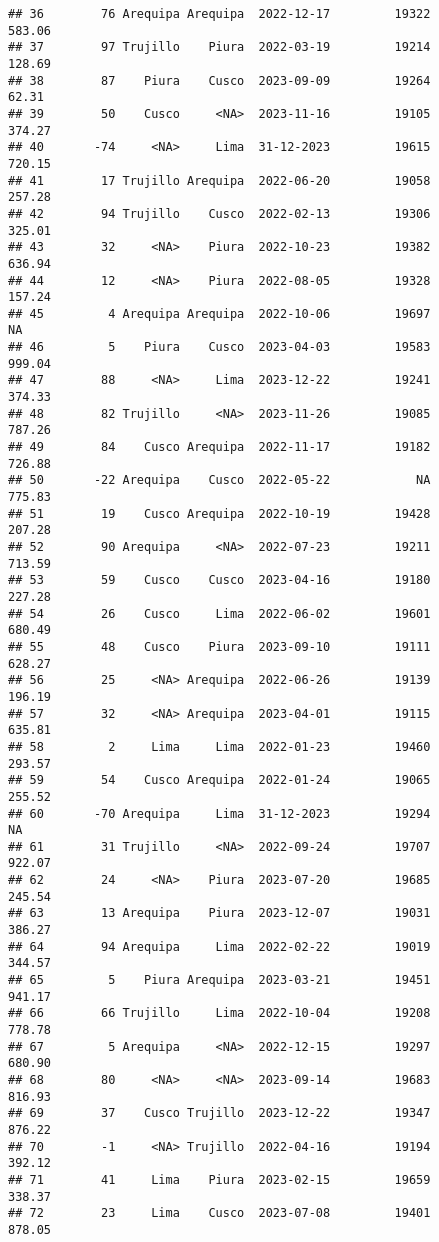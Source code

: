 \documentclass[
]{article}
\begin{document}
\begin{verbatim}
## 36        76 Arequipa Arequipa  2022-12-17         19322      583.06
## 37        97 Trujillo    Piura  2022-03-19         19214      128.69
## 38        87    Piura    Cusco  2023-09-09         19264       62.31
## 39        50    Cusco     <NA>  2023-11-16         19105      374.27
## 40       -74     <NA>     Lima  31-12-2023         19615      720.15
## 41        17 Trujillo Arequipa  2022-06-20         19058      257.28
## 42        94 Trujillo    Cusco  2022-02-13         19306      325.01
## 43        32     <NA>    Piura  2022-10-23         19382      636.94
## 44        12     <NA>    Piura  2022-08-05         19328      157.24
## 45         4 Arequipa Arequipa  2022-10-06         19697          NA
## 46         5    Piura    Cusco  2023-04-03         19583      999.04
## 47        88     <NA>     Lima  2023-12-22         19241      374.33
## 48        82 Trujillo     <NA>  2023-11-26         19085      787.26
## 49        84    Cusco Arequipa  2022-11-17         19182      726.88
## 50       -22 Arequipa    Cusco  2022-05-22            NA      775.83
## 51        19    Cusco Arequipa  2022-10-19         19428      207.28
## 52        90 Arequipa     <NA>  2022-07-23         19211      713.59
## 53        59    Cusco    Cusco  2023-04-16         19180      227.28
## 54        26    Cusco     Lima  2022-06-02         19601      680.49
## 55        48    Cusco    Piura  2023-09-10         19111      628.27
## 56        25     <NA> Arequipa  2022-06-26         19139      196.19
## 57        32     <NA> Arequipa  2023-04-01         19115      635.81
## 58         2     Lima     Lima  2022-01-23         19460      293.57
## 59        54    Cusco Arequipa  2022-01-24         19065      255.52
## 60       -70 Arequipa     Lima  31-12-2023         19294          NA
## 61        31 Trujillo     <NA>  2022-09-24         19707      922.07
## 62        24     <NA>    Piura  2023-07-20         19685      245.54
## 63        13 Arequipa    Piura  2023-12-07         19031      386.27
## 64        94 Arequipa     Lima  2022-02-22         19019      344.57
## 65         5    Piura Arequipa  2023-03-21         19451      941.17
## 66        66 Trujillo     Lima  2022-10-04         19208      778.78
## 67         5 Arequipa     <NA>  2022-12-15         19297      680.90
## 68        80     <NA>     <NA>  2023-09-14         19683      816.93
## 69        37    Cusco Trujillo  2023-12-22         19347      876.22
## 70        -1     <NA> Trujillo  2022-04-16         19194      392.12
## 71        41     Lima    Piura  2023-02-15         19659      338.37
## 72        23     Lima    Cusco  2023-07-08         19401      878.05

\end{verbatim}
\end{document}
